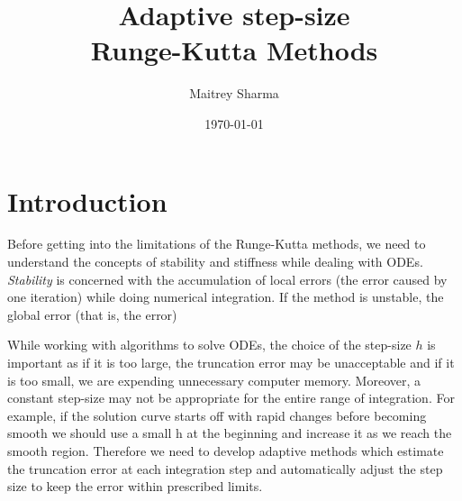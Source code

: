 \documentclass[12pt]{article}
\title{\textbf{Adaptive step-size} \\ \textbf{Runge-Kutta Methods}}
\author{Maitrey Sharma}
\date{\today}
\begin{document}
\maketitle


\section{Introduction}
Before getting into the limitations of the Runge-Kutta methods, we need to understand the concepts of stability and stiffness while dealing with ODEs. \textit{Stability} is concerned with the accumulation of local errors (the error caused by one iteration) while doing numerical integration. If the method is unstable, the global error (that is, the error)

While working with algorithms to solve ODEs, the choice of the step-size $h$ is important as if it is too large, the truncation error may be unacceptable and if it is too small, we are expending unnecessary computer memory. Moreover, a constant step-size may
not be appropriate for the entire range of integration. For example, if the solution curve starts off with rapid changes before becoming smooth we should use a small h at the beginning and increase it as we reach the smooth region. Therefore we need to develop adaptive methods which estimate the truncation error at each integration step and automatically adjust the step size to keep the error within prescribed limits.
\end{document}
